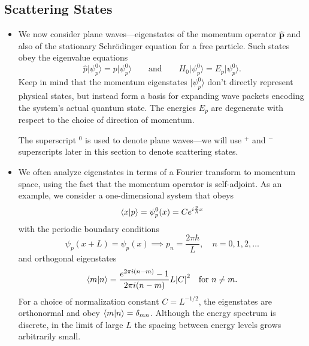 \documentclass[11pt, a4paper]{article}
\newcommand{\Schro}{Schr\"{o}dinger\xspace}
\renewcommand{\vec}[1]{\bm{#1}}  %
\newcommand{\bket}[1]{\big | {#1} \big \rangle }
\begin{document}
\subsection{Scattering States}
\begin{itemize}
    \item We now consider plane waves---eigenstates of the momentum operator $ \hat{\vec{p}} $ and also of the stationary \Schro equation for a free particle. Such states obey the eigenvalue equations
    \begin{equation*}
        \hat{p} \bket{\psi_{p}^{0}} = p\bket{\psi_{p}^{0}} \qquad \text{and} \qquad H_{0} \bket{\psi_{p}^{0}} = E_{p}\bket{\psi_{p}^{0}}.
    \end{equation*}
    Keep in mind that the momentum eigenstates $ \bket{\psi_{p}^{0}} $ don't directly represent physical states, but instead form a basis for expanding wave packets encoding the system's actual quantum state. The energies $ E_{p} $ are degenerate with respect to the choice of direction of momentum.
    
    The superscript $ {}^{0} $ is used to denote plane waves---we will use $ {}^{+} $ and $ {}^{-} $ superscripts later in this section to denote scattering states.

    \item We often analyze eigenstates in terms of a Fourier transform to momentum space, using the fact that the momentum operator is self-adjoint. As an example, we consider a one-dimensional system that obeys
    \begin{equation*}
        \braket{x}{p} = \psi_{p}^{0}(x) = Ce^{i \frac{p}{\hbar}x}
    \end{equation*}
    with the periodic boundary conditions
    \begin{equation*}
        \psi_{p}(x + L) = \psi_{p}(x) \implies p_{n} = \frac{2\pi \hbar}{L}, \quad n = 0, 1, 2, \ldots
    \end{equation*}
    and orthogonal eigenstates
    \begin{equation*}
        \braket{m}{n} = \frac{e^{2 \pi i(n - m)} - 1}{2\pi i (n-m)}L \abs{C}^{2} \quad \text{for } n \neq m.
    \end{equation*}
    For a choice of normalization constant $ C = L^{-1/2} $, the eigenstates are orthonormal and obey $ \braket{m}{n} = \delta_{mn} $. Although the energy spectrum is discrete, in the limit of large $ L $ the spacing between energy levels grows arbitrarily small. 


\end{itemize}
\end{document}
